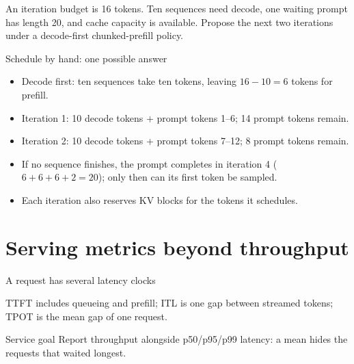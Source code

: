 \documentclass[handout]{beamer}
\begin{document}
{An iteration budget is 16 tokens. Ten sequences need decode, one waiting prompt has length 20, and cache capacity is available. Propose the next two iterations under a decode-first chunked-prefill policy.}

\begin{frame}{Schedule by hand: one possible answer}
  \begin{itemize}
      \setlength{\itemsep}{9pt}
    \item Decode first: ten sequences take ten tokens, leaving $16-10=6$ tokens for prefill.
    \item Iteration 1: 10 decode tokens + prompt tokens 1--6; 14 prompt tokens remain.
    \item Iteration 2: 10 decode tokens + prompt tokens 7--12; 8 prompt tokens remain.
    \item If no sequence finishes, the prompt completes in iteration 4 ($6+6+6+2=20$); only then can its first token be sampled.
    \item Each iteration also reserves KV blocks for the tokens it schedules.
  \end{itemize}
\end{frame}

\section{Serving metrics beyond throughput}

\begin{frame}{A request has several latency clocks}
  \centering
  \par\vspace{6pt}
  \small TTFT includes queueing and prefill; ITL is one gap between streamed tokens; TPOT is the mean gap of one request.
  \begin{block}{Service goal}
    Report throughput alongside p50/p95/p99 latency: a mean hides the requests that waited longest.
  \end{block}
\end{frame}
\end{document}
